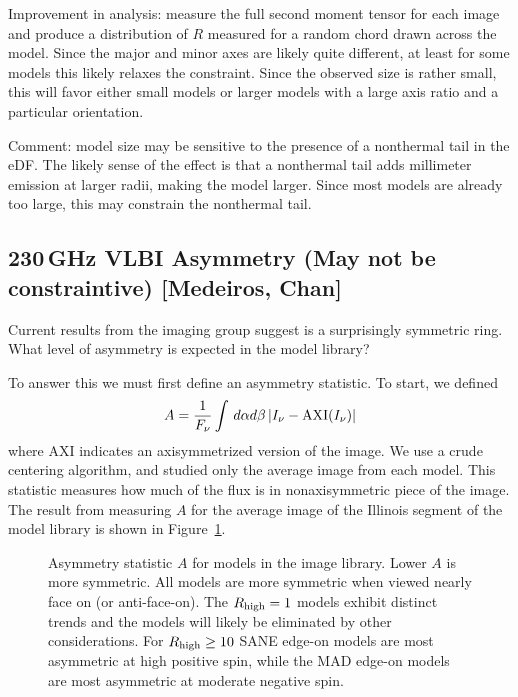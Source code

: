 \documentclass[twocolumn,tighten,dvipsnames,linenumbers]{aastex63}
\begin{document}
Improvement in analysis: measure the full second moment tensor for each image and produce a distribution of $R$ measured for a random chord drawn across the model.  Since the major and minor axes are likely quite different, at least for some models \citep{2019ApJ...871...30I} this likely relaxes the constraint.  Since the observed size is rather small, this will favor either small models or larger models with a large axis ratio and a particular orientation.

Comment: model size may be sensitive to the presence of a nonthermal tail in the eDF.  The likely sense of the effect is that a nonthermal tail adds millimeter emission at larger radii, making the model larger.  Since most models are already too large, this may constrain the nonthermal tail.

\subsection{230\,GHz VLBI Asymmetry (May not be constraintive)
  [Medeiros, Chan]}
\label{sec:230asym}

Current results from the imaging group suggest \sgra is a surprisingly symmetric ring.   What level of asymmetry is expected in the model library?

To answer this we must first define an asymmetry statistic.  To start, we defined
\begin{equation}
  A = \frac{1}{F_\nu} \int \, d\alpha d\beta \, | I_\nu - {\rm AXI}(I_\nu) |
\end{equation}
where AXI indicates an axisymmetrized version of the image.  We use a crude centering algorithm, and studied only the average image from each model.  This statistic measures how much of the flux is in nonaxisymmetric piece of the image.   The result from measuring $A$ for the average image of the Illinois segment of the \sgra model library is shown in Figure~\ref{fig:asymm}.

\begin{figure}
  \caption{Asymmetry statistic $A$ for models in the \sgra image library.  Lower $A$ is more symmetric.  All models are more symmetric when viewed nearly face on (or anti-face-on).  The ${R_\mathrm{high}} = 1$ models exhibit distinct trends and the models will likely be eliminated by other considerations.  For ${R_\mathrm{high}} \ge 10$ SANE edge-on models are most asymmetric at high positive spin, while the MAD edge-on models are most asymmetric at moderate negative spin.}
  \label{fig:asymm}
\end{figure}
\end{document}
